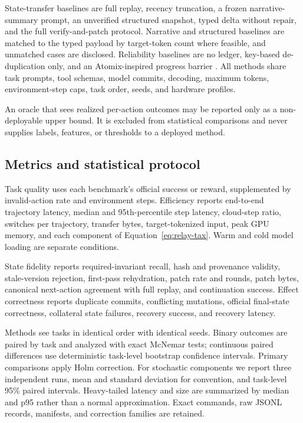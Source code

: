 \documentclass[10pt]{article}
\begin{document}
State-transfer baselines are full replay, recency truncation, a frozen
narrative-summary prompt, an unverified structured snapshot, typed delta
without repair, and the full verify-and-patch protocol. Narrative and
structured baselines are matched to the typed payload by target-token count
where feasible, and unmatched cases are disclosed. Reliability baselines are
no ledger, key-based de-duplication only, and an Atomix-inspired progress
barrier \citep{mohammadi2026atomix}. All methods share task prompts, tool
schemas, model commits, decoding, maximum tokens, environment-step caps, task
order, seeds, and hardware profiles.

An oracle that sees realized per-action outcomes may be reported only as a
non-deployable upper bound. It is excluded from statistical comparisons and
never supplies labels, features, or thresholds to a deployed method.

\subsection{Metrics and statistical protocol}
\label{sec:metrics}

Task quality uses each benchmark's official success or reward, supplemented
by invalid-action rate and environment steps. Efficiency reports end-to-end
trajectory latency, median and 95th-percentile step latency, cloud-step ratio,
switches per trajectory, transfer bytes, target-tokenized input, peak GPU
memory, and each component of Equation~\ref{eq:relay-tax}. Warm and cold model
loading are separate conditions.

State fidelity reports required-invariant recall, hash and provenance
validity, stale-version rejection, first-pass rehydration, patch rate and
rounds, patch bytes, canonical next-action agreement with full replay, and
continuation success. Effect correctness reports duplicate commits,
conflicting mutations, official final-state correctness, collateral state
failures, recovery success, and recovery latency.

Methods see tasks in identical order with identical seeds. Binary outcomes are
paired by task and analyzed with exact McNemar tests; continuous paired
differences use deterministic task-level bootstrap confidence intervals.
Primary comparisons apply Holm correction. For stochastic components we
report three independent runs, mean and standard deviation for convention,
and task-level 95\% paired intervals. Heavy-tailed latency and size are
summarized by median and p95 rather than a normal approximation. Exact
commands, raw JSONL records, manifests, and correction families are retained.
\end{document}
